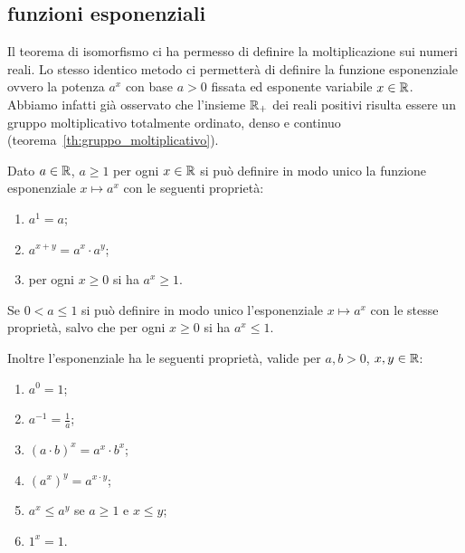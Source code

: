 \subsection{funzioni esponenziali}
%
%
\label{sec:esponenziale}%

Il teorema di isomorfismo ci ha permesso di definire la moltiplicazione sui 
numeri reali. 
Lo stesso identico metodo ci permetterà di definire la funzione esponenziale
ovvero la potenza $a^x$ con base $a>0$ fissata ed esponente variabile $x\in {\mathbb R}$.
Abbiamo infatti già osservato che l'insieme ${\mathbb R}_+$ dei reali positivi
risulta essere un gruppo moltiplicativo totalmente ordinato, denso e continuo 
(teorema~\ref{th:gruppo_moltiplicativo}).

\begin{theorem}
  \label{th:esponenziale}%
Dato $a\in {\mathbb R}$, $a\ge 1$ per ogni $x\in {\mathbb R}$ si può definire in modo unico 
la funzione esponenziale $x\mapsto a^x$ con le seguenti proprietà:
\begin{enumerate}
  \item $a^1=a$;
  \item $a^{x+y} = a^x \cdot a^y$;
  \item per ogni $x\ge 0$ si ha $a^x\ge 1$.
\end{enumerate}
Se $0<a \le 1$ si può definire in modo unico l'esponenziale $x\mapsto a^x$ 
con le stesse proprietà, salvo che per ogni $x\ge 0$ si ha $a^x\le 1$.

Inoltre l'esponenziale ha le seguenti proprietà, 
valide per $a,b>0$, $x,y\in {\mathbb R}$:
\begin{enumerate}
  \item $a^0=1$;
  \item $a^{-1} = \frac{1}{a}$;
  \item $(a\cdot b)^x = a^x\cdot b^x$;
  \item $(a^x)^y = a^{x\cdot y}$;
  \item $a^x \le a^y$ se $a\ge 1$ e $x\le y$;
  \item $1^x=1$.
\end{enumerate}
\end{theorem}
%
